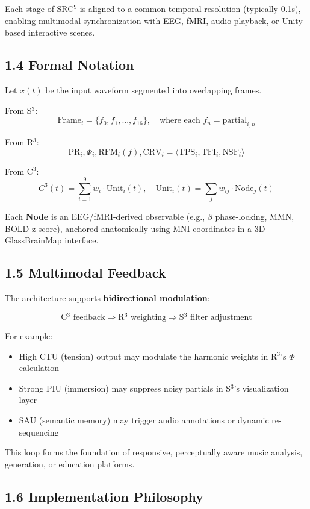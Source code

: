 \documentclass[10pt]{article}
\begin{document}
Each stage of SRC$^{9}$ is aligned to a common temporal resolution (typically 0.1s), enabling multimodal synchronization with EEG, fMRI, audio playback, or Unity-based interactive scenes.

\subsection*{1.4 Formal Notation}

Let $x(t)$ be the input waveform segmented into overlapping frames.

From S$^{3}$:
\[
\text{Frame}_i = \{f_0, f_1, ..., f_{16}\}, \quad \text{where each } f_n = \text{partial}_{i,n}
\]

From R$^{3}$:
\[
\text{PR}_i, \Phi_i, \text{RFM}_i(f), \text{CRV}_i = \langle \text{TPS}_i, \text{TFI}_i, \text{NSF}_i \rangle
\]

From C$^{3}$:
\[
C^{3}(t) = \sum_{i=1}^{9} w_i \cdot \text{Unit}_i(t), \quad \text{Unit}_i(t) = \sum_j w_{ij} \cdot \text{Node}_j(t)
\]

Each \textbf{Node} is an EEG/fMRI-derived observable (e.g., $\beta$ phase-locking, MMN, BOLD z-score), anchored anatomically using MNI coordinates in a 3D GlassBrainMap interface.

\subsection*{1.5 Multimodal Feedback}

The architecture supports \textbf{bidirectional modulation}:

\[
\text{C$^{3}$ feedback} \Rightarrow \text{R$^{3}$ weighting} \Rightarrow \text{S$^{3}$ filter adjustment}
\]

For example:

\begin{itemize}
    \item High CTU (tension) output may modulate the harmonic weights in R$^{3}$'s $\Phi$ calculation
    \item Strong PIU (immersion) may suppress noisy partials in S$^{3}$’s visualization layer
    \item SAU (semantic memory) may trigger audio annotations or dynamic re-sequencing
\end{itemize}

This loop forms the foundation of responsive, perceptually aware music analysis, generation, or education platforms.

\subsection*{1.6 Implementation Philosophy}
\end{document}
